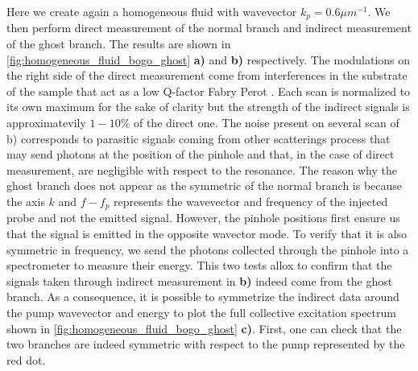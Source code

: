Here we create again a homogeneous fluid with wavevector $k_p =0.6 \mu m^{-1}$. We then 
perform direct measurement of the normal branch and indirect measurement of the ghost branch. The results are shown in \autoref{fig:homogeneous_fluid_bogo_ghost} \textbf{a)} and \textbf{b)} respectively.  The modulations on the right side of the direct measurement come from interferences in the substrate of the sample
that act as a low Q-factor Fabry Perot \cite{claude_phd}. Each scan is normalized to its own maximum for the sake of clarity but 
the strength of the indirect signals is approximatevily $1-10\%$ of the direct one. The noise present on several scan of b) corresponds to parasitic signals coming from other scatterings process that may send photons at the position of the pinhole and that, in the case of direct measurement, are negligible with respect to the resonance. The reason why the ghost branch does not appear as the symmetric of the normal branch 
is because the axis $k$ and $f-f_p$ represents the wavevector and frequency of the injected probe and not the emitted signal. However, the pinhole positions first ensure us that the signal is emitted in the opposite wavector mode. To verify that it is also symmetric in frequency, we send the photons collected through the pinhole 
into a spectrometer to measure their energy. This two tests allox to confirm that the signals taken through indirect measurement in \textbf{b)} indeed come from the ghost branch. As a consequence, it is possible  to symmetrize the indirect data around the pump wavevector and energy to plot the full collective excitation spectrum shown in \autoref{fig:homogeneous_fluid_bogo_ghost} \textbf{c)}. First, one can check that the two branches 
are indeed symmetric with respect to the pump represented by the red dot.
